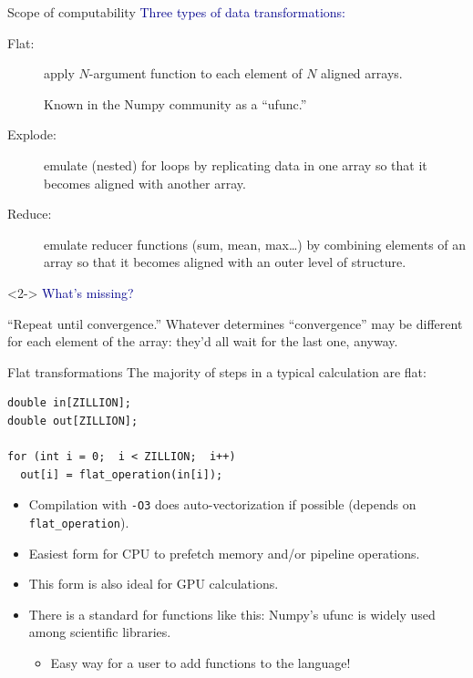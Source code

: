 \documentclass{beamer}
\begin{document}
\begin{frame}{Scope of computability}
\vspace{0.5 cm}
\textcolor{darkblue}{Three types of data transformations:}
\begin{description}
\item[Flat:] apply $N$-argument function to each element of $N$ aligned arrays.

\vspace{0.2 cm}
Known in the Numpy community as a ``ufunc.''

\item[Explode:] emulate (nested) for loops by replicating data in one array so that it becomes aligned with another array.

\item[Reduce:] emulate reducer functions (sum, mean, max\ldots) by combining elements of an array so that it becomes aligned with an outer level of structure.
\end{description}

\vfill
\begin{uncoverenv}<2->
\textcolor{darkblue}{What's missing?}

\vspace{0.2 cm}
``Repeat until convergence.'' Whatever determines ``convergence'' may be different for each element of the array: they'd all wait for the last one, anyway.
\end{uncoverenv}
\end{frame}

\begin{frame}[fragile]{Flat transformations}
\vspace{0.5 cm}
The majority of steps in a typical calculation are flat:

\begin{center}
\begin{minipage}{0.7\linewidth}
\small
\begin{verbatim}
double in[ZILLION];
double out[ZILLION];

for (int i = 0;  i < ZILLION;  i++)
  out[i] = flat_operation(in[i]);
\end{verbatim}
\end{minipage}
\end{center}

\begin{itemize}
\item Compilation with {\tt -O3} does auto-vectorization if possible (depends on {\tt flat\_operation}).
\item Easiest form for CPU to prefetch memory and/or pipeline operations.
\item This form is also ideal for GPU calculations.
\item There is a standard for functions like this: Numpy's ufunc is widely used among scientific libraries.
\begin{itemize}
\item Easy way for a user to add functions to the language!
\end{itemize}
\end{itemize}
\end{frame}
\end{document}
